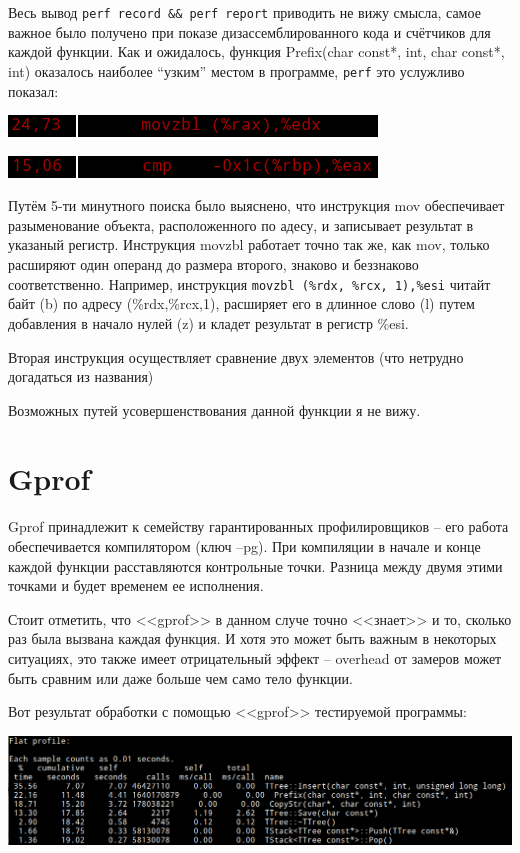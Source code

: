\documentclass[12pt]{article}
\begin{document}
Весь вывод \lstinline|perf record && perf report| приводить не вижу смысла, самое важное было получено при показе дизассемблированного кода и счётчиков для каждой функции. Как и ожидалось, функция Prefix(char const*, int, char const*, int) оказалось наиболее ``узким'' местом  в программе, \lstinline|perf| это услужливо показал:

\includegraphics{mov.png} 

\includegraphics{cmp.png}

Путём 5-ти минутного поиска было выяснено, что инструкция mov обеспечивает разыменование объекта, расположенного по адесу, и записывает результат в указаный регистр. Инструкция movzbl работает точно так же, как mov, только расширяют один операнд до размера второго, знаково и беззнаково соответственно. Например, инструкция \lstinline|movzbl (%rdx, %rcx, 1),%esi| читайт байт (b) по адресу (\%rdx,\%rcx,1), расширяет его в длинное слово (l) путем добавления в начало нулей (z) и кладет результат в регистр \%esi.

Вторая инструкция осуществляет сравнение двух элементов (что нетрудно догадаться из названия)

Возможных путей усовершенствования данной функции я не вижу.

\section*{Gprof}

Gprof принадлежит к семейству гарантированных профилировщиков -- его работа обеспечивается компилятором (ключ --pg). При компиляции в начале и конце каждой функции расставляются контрольные точки. Разница между двумя этими точками и будет временем ее исполнения.

Стоит отметить, что <<gprof>> в данном случе точно <<знает>> и то, сколько раз была вызвана каждая функция. И хотя это может быть важным в некоторых ситуациях, это также имеет отрицательный эффект -- overhead от замеров может быть сравним или даже больше чем само тело функции.
\newline

Вот результат обработки с помощью <<gprof>> тестируемой программы:

\includegraphics[scale=0.55]{gprof.png}
\end{document}

